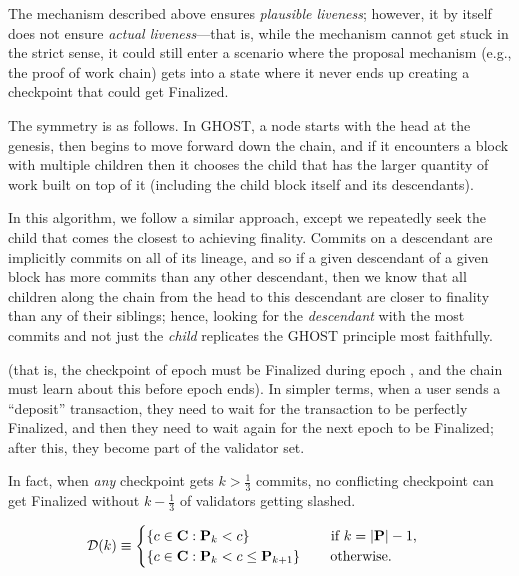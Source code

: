 The mechanism described above ensures \textit{plausible liveness}; however, it by itself does not ensure \textit{actual liveness}---that is, while the mechanism cannot get stuck in the strict sense, it could still enter a scenario where the proposal mechanism (e.g., the proof of work chain) gets into a state where it never ends up creating a checkpoint that could get Finalized.


The symmetry is as follows. In GHOST, a node starts with the head at the genesis, then begins to move forward down the chain, and if it encounters a block with multiple children then it chooses the child that has the larger quantity of work built on top of it (including the child block itself and its descendants).

In this algorithm, we follow a similar approach, except we repeatedly seek the child that comes the closest to achieving finality. Commits on a descendant are implicitly commits on all of its lineage, and so if a given descendant of a given block has more commits than any other descendant, then we know that all children along the chain from the head to this descendant are closer to finality than any of their siblings; hence, looking for the \textit{descendant} with the most commits and not just the \textit{child} replicates the GHOST principle most faithfully. 

(that is, the checkpoint of epoch \epoch must be Finalized during epoch \epoch, and the chain must learn about this before epoch \epoch ends). In simpler terms, when a user sends a ``deposit'' transaction, they need to wait for the transaction to be perfectly Finalized, and then they need to wait again for the next epoch to be Finalized; after this, they become part of the validator set.

In fact, when \textit{any} checkpoint gets $k > \frac{1}{3}$ commits, no conflicting checkpoint can get Finalized without $k - \frac{1}{3}$ of validators getting slashed. 


\begin{equation}
    \mathcal{D}(k) \equiv \begin{cases}
     \left\{ c \in \mathbf{C} : \mathbf{P}_k < c \right\} \qquad \qquad \qquad \!\! \textnormal{if $k = |\mathbf{P}| - 1$,} \\
         \left\{ c \in \mathbf{C} : \mathbf{P}_k < c \leq \mathbf{P}_{k+1} \right\} \qquad \textnormal{otherwise.} \\
     \end{cases}
\end{equation}

